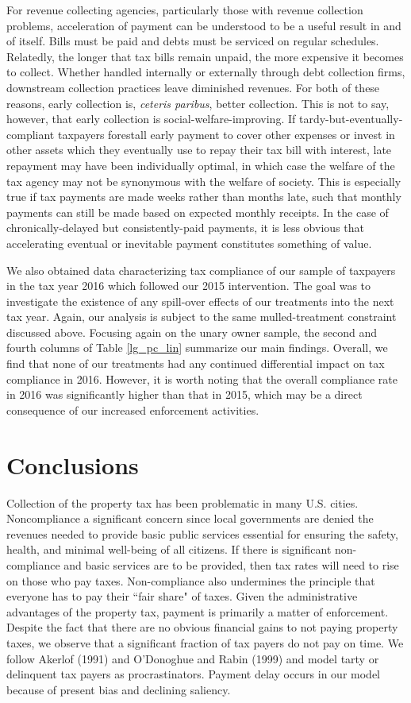 \documentclass[12pt]{article}
\begin{document}
For revenue collecting agencies, particularly those with revenue
collection problems, acceleration of payment can be understood to be a
useful result in and of itself. Bills must be paid and debts must be
serviced on regular schedules. Relatedly, the longer that tax bills
remain unpaid, the more expensive it becomes to collect. Whether
handled internally or externally through debt collection firms,
downstream collection practices leave diminished revenues. For both of
these reasons, early collection is, \textit{ceteris paribus}, better
collection. This is not to say, however, that early collection is
social-welfare-improving. If tardy-but-eventually-compliant taxpayers
forestall early payment to cover other expenses or invest
in other assets which they eventually use to repay their tax bill with
interest, late repayment may have been individually optimal, 
in which case the welfare of the tax agency may not be synonymous
with the welfare of society. This is especially true if tax payments
are made weeks rather than months late, such that monthly payments can
still be made based on expected monthly receipts.  In the case
of chronically-delayed but consistently-paid payments, it is less
obvious that accelerating eventual or inevitable payment constitutes
something of value.

We also obtained data characterizing tax compliance of our sample of
taxpayers in the tax year 2016 which followed our 2015 intervention.
The goal was to investigate the existence of any spill-over effects of
our treatments into the next tax year. Again, our analysis is subject
to the same mulled-treatment constraint discussed above.  Focusing
again on the unary owner sample, the second and fourth columns of
Table \ref{lg_pc_lin} summarize our main findings. Overall, we find
that none of our treatments had any continued differential impact on
tax compliance in 2016. However, it is worth noting that the overall
compliance rate in 2016 was significantly higher than that in 2015,
which may be a direct consequence of our increased enforcement
activities.


\section{Conclusions}


Collection of the property tax has been problematic in many
U.S. cities.  Noncompliance a significant concern since local
governments are denied the revenues needed to provide basic public
services essential for ensuring the safety, health, and minimal
well-being of all citizens. If there is significant non-compliance and
basic services are to be provided, then tax rates will need to rise on
those who pay taxes. Non-compliance also undermines the principle that
everyone has to pay their ``fair share" of taxes. Given the
administrative advantages of the property tax, payment is primarily a
matter of enforcement.  Despite the fact that there are no obvious
financial gains to not paying property taxes, we observe that a
significant fraction of tax payers do not pay on time. We follow
Akerlof (1991) and O'Donoghue and Rabin (1999) and model tarty or
delinquent tax payers as procrastinators. Payment delay occurs in our
model because of present bias and declining saliency.
\end{document}
